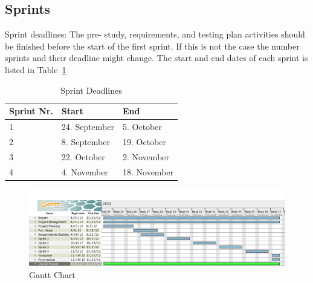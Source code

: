 \subsection {Sprints}

Sprint deadlines:
The pre- study, requirements, and testing plan activities should be finished before the start of the first sprint. If this is not the case the number sprints and their deadline might change. The start and end dates of each sprint is listed in Table~\ref{table:sprintdeadlines}

\begin{table}
\caption{Sprint Deadlines}
\centering
\begin{tabular}{ l l l }
\hline
Sprint Nr.		&Start		&End		\\
\hline
1		&24. September		&5. October		\\
2		&8. September			&19. October		\\
3		&22. October			&2. November		\\
4		&4. November			&18. November	\\
\hline
\end{tabular}
\label{table:sprintdeadlines}
\end{table}

\begin{figure}
\centering
\includegraphics[width=6in]{image/gantt.png}
\caption{Gantt Chart}
\label{figure:gantt}
\end{figure}

